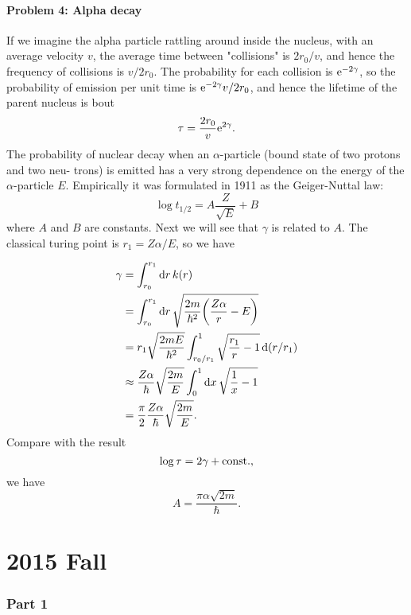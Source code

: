 \documentclass[10pt]{article}
\begin{document}
\subsection{Problem 4: Alpha decay}
If we imagine the alpha particle rattling around inside the nucleus, with an average velocity $v$, the average time between "collisions" is $2r_0 / v$, and hence the frequency of collisions is $v / 2 r_0$. The probability for each collision is ${\mathrm{e}}^{-2\gamma}$, so the probability of emission per unit time is ${\mathrm{e}}^{-2 \gamma} v /2 r_0$, and hence the lifetime of the parent nucleus is bout 
\begin{equation}
	\tau = \frac{2r_0}{v} {\mathrm{e}}^{2 \gamma}.
\end{equation}
The probability of nuclear decay when an $\alpha$-particle (bound state of two protons and two neu- trons) is emitted has a very strong dependence on the energy of the $\alpha$-particle $E$. Empirically it was formulated in 1911 as the Geiger-Nuttal law: 
\begin{equation}
	\log{t_{1/2}}  = A \frac{Z}{\sqrt{E}} + B
\end{equation}
where $A$ and $B$ are constants. Next we will see that $\gamma$ is related to $A$. The classical turing point is $r_1 = Z \alpha / E$, so we have 

\begin{align*}
	 \gamma &= \int_{r_0}^{r_1} \dd{r} k(r) \\
			&= \int_{r_0}^{r_1} \dd{r} \sqrt{\frac{2m}{\hbar^2} \qty(\frac{Z\alpha}{r} - E)} \\
			&= r_1 \sqrt{\frac{2mE}{\hbar^2}}\int_{{r_0} / {r_1}}^{1}  \sqrt{\frac{r_1}{r} - 1} \dd(r / r_1) \\
			&\approx \frac{Z\alpha}{\hbar}\sqrt{\frac{2m}{E}} \int_0^1\dd{x} \sqrt{\frac{1}{x} - 1} \\
			&= \frac{\pi}{2} \frac{Z\alpha}{\hbar}\sqrt{\frac{2m}{E}}.
\end{align*}
Compare with the result 
\begin{equation}
	\log{\tau} = 2 \gamma + {\mathrm{const.}},
\end{equation}
we have 
\begin{equation}
	A = \frac{\pi \alpha \sqrt{2m}}{\hbar}.
\end{equation}
\part{2015 Fall}
\section{Part 1}
\end{document}
